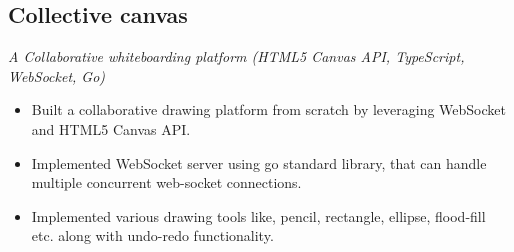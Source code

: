 \documentclass[a4paper]{article}
\begin{document}
\subsection{Collective canvas}
\textit{A Collaborative whiteboarding platform (HTML5 Canvas API, TypeScript, WebSocket, Go)}
\hfill
\href{https://collective-canvas.netlify.app/}{ \faLink}
\textbar
\href{https://github.com/jatinkumar-me/collective-canvas.git}{ \faCode}
\href{https://github.com/jatinkumar-me/cc-server}{ \faCode}
\begin{itemize}
    \item Built a collaborative drawing platform from scratch by leveraging WebSocket and HTML5 Canvas API. 
    \item Implemented WebSocket server using go standard library, that can handle multiple concurrent web-socket connections.
    \item Implemented various drawing tools like, pencil, rectangle, ellipse, flood-fill etc. along with undo-redo functionality.
\end{itemize}
\end{document}
